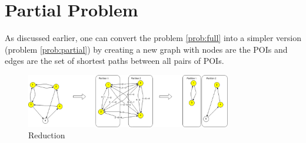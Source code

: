 \section{Partial Problem}

As discussed earlier, one can convert the problem \ref{prob:full} into a simpler version (problem \ref{prob:partial}) by creating a new graph with nodes are the POIs and edges are the set of shortest paths between all pairs of POIs.

\begin{figure}[h!]
\centering
\includegraphics[width=0.8\textwidth]{assets/reduction.png}
\caption{Reduction}
\label{fig:reduction}
\end{figure}

